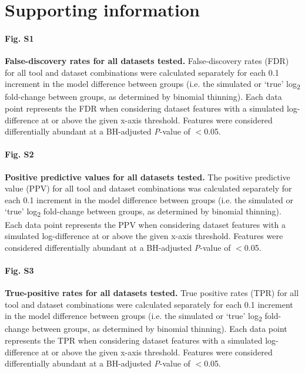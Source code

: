 \documentclass[10pt,letterpaper]{article}
\begin{document}

\section*{Supporting information}

\paragraph*{Fig. S1}
\label{fig:supFigFDR_all}
\textbf{False-discovery rates for all datasets tested.} False-discovery rates (FDR) for all tool and dataset combinations were calculated separately for each 0.1 increment in the model difference between groups (i.e. the simulated or `true' log\textsubscript{2} fold-change between groups, as determined by binomial thinning). Each data point represents the FDR when considering dataset features with a simulated log-difference at or above the given x-axis threshold. Features were considered differentially abundant at a BH-adjusted \textit{P}-value of $<$0.05.

\paragraph*{Fig. S2}
\label{fig:supFigPPV_all}
\textbf{Positive predictive values for all datasets tested.} The positive predictive value (PPV) for all tool and dataset combinations was calculated separately for each 0.1 increment in the model difference between groups (i.e. the simulated or `true' log\textsubscript{2} fold-change between groups, as determined by binomial thinning). Each data point represents the PPV when considering dataset features with a simulated log-difference at or above the given x-axis threshold. Features were considered differentially abundant at a BH-adjusted \textit{P}-value of $<$0.05.

\paragraph*{Fig. S3}
\label{fig:supFigTPR_all}
\textbf{True-positive rates for all datasets tested.} True positive rates (TPR) for all tool and dataset combinations were calculated separately for each 0.1 increment in the model difference between groups (i.e. the simulated or `true' log\textsubscript{2} fold-change between groups, as determined by binomial thinning). Each data point represents the TPR when considering dataset features with a simulated log-difference at or above the given x-axis threshold. Features were considered differentially abundant at a BH-adjusted \textit{P}-value of $<$0.05.
\end{document}

